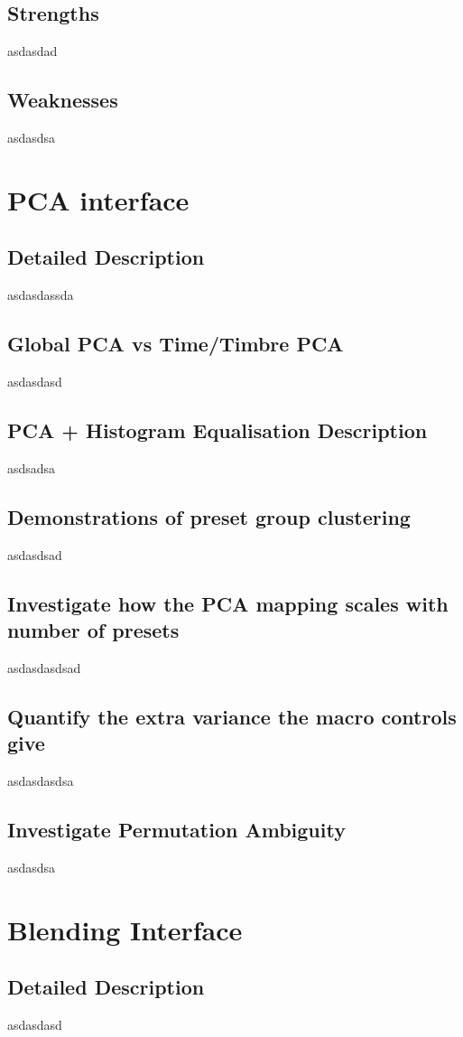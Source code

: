 \documentclass[11pt, oneside]{report}   	%
\begin{document}
\subsection{Strengths}
asdasdad
\subsection{Weaknesses}
asdasdsa

\section{PCA interface}
\subsection{Detailed Description}
asdasdassda
\subsection{Global PCA vs Time/Timbre PCA}
asdasdasd
\subsection{PCA + Histogram Equalisation Description}
asdsadsa
\subsection{Demonstrations of preset group clustering}
asdasdsad
\subsection{Investigate how the PCA mapping scales with number of presets}
asdasdasdsad
\subsection{Quantify the extra variance the macro controls give}
asdasdasdsa
\subsection{Investigate Permutation Ambiguity}
asdasdsa

\section{Blending Interface}
\subsection{Detailed Description}
asdasdasd
\end{document}

